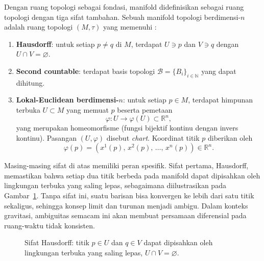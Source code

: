 Dengan ruang topologi sebagai fondasi, manifold didefinisikan sebagai ruang topologi dengan tiga sifat tambahan. Sebuah manifold topologi berdimensi-$n$ adalah ruang topologi $(M, \tau)$ yang memenuhi \cite{nakahara2003geometry, eguchi1980}:
\begin{enumerate}[label=\roman*.]
    \item \textbf{Hausdorff}: untuk setiap $p \neq q$ di $M$, terdapat $U \ni p$ dan $V \ni q$ dengan $U \cap V = \varnothing$.

    \item \textbf{Second countable}: terdapat basis topologi $\mathcal{B} = \{B_i\}_{i \in \mathbb{N}}$ yang dapat dihitung.

    \item \textbf{Lokal-Euclidean berdimensi-$n$}: untuk setiap $p \in M$, terdapat himpunan terbuka $U \subset M$ yang memuat $p$ beserta pemetaan
    \begin{equation}
        \varphi : U \longrightarrow \varphi(U) \subset \mathbb{R}^n,
    \end{equation}
    yang merupakan homeomorfisme (fungsi bijektif kontinu dengan invers kontinu). Pasangan $(U, \varphi)$ disebut \textit{chart}. Koordinat titik $p$ diberikan oleh
    \begin{equation}
        \varphi(p) = (x^1(p),\, x^2(p),\, \ldots,\, x^n(p)) \in \mathbb{R}^n.
    \end{equation}
\end{enumerate}

Masing-masing sifat di atas memiliki peran spesifik. Sifat pertama, Hausdorff, memastikan bahwa setiap dua titik berbeda pada manifold dapat dipisahkan oleh lingkungan terbuka yang saling lepas, sebagaimana diilustrasikan pada Gambar~\ref{fig:hausdorff}. Tanpa sifat ini, suatu barisan bisa konvergen ke lebih dari satu titik sekaligus, sehingga konsep limit dan turunan menjadi ambigu. Dalam konteks gravitasi, ambiguitas semacam ini akan membuat persamaan diferensial pada ruang-waktu tidak konsisten.

\begin{figure}[H]
\centering
{}
\caption{Sifat Hausdorff: titik $p \in U$ dan $q \in V$ dapat dipisahkan oleh lingkungan terbuka yang saling lepas, $U \cap V = \varnothing$.}
\label{fig:hausdorff}
\end{figure}

